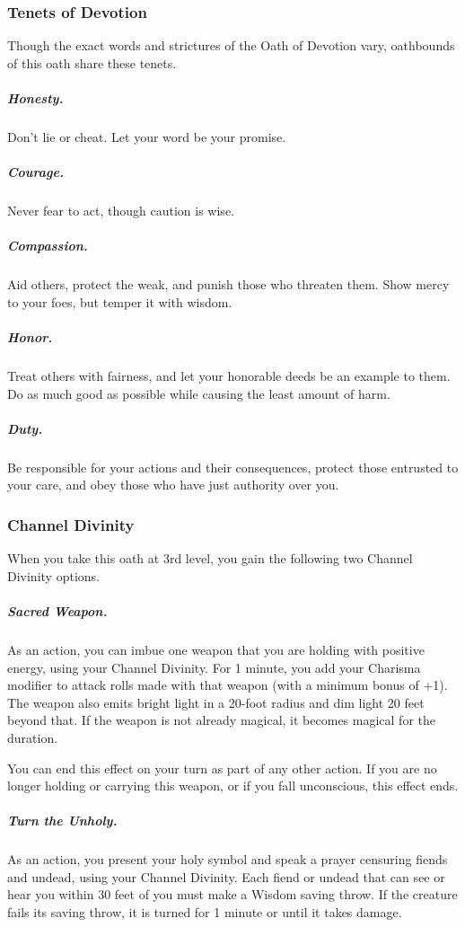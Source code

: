\subsubsection{Tenets of Devotion}

Though the exact words and strictures of the Oath of Devotion vary, oathbounds of this oath share these tenets.

\subparagraph*{Honesty.} Don't lie or cheat. Let your word be your promise.

\subparagraph*{Courage.} Never fear to act, though caution is wise.

\subparagraph*{Compassion.} Aid others, protect the weak, and punish those who threaten them. Show mercy to your foes, but temper it with wisdom.

\subparagraph*{Honor.} Treat others with fairness, and let your honorable deeds be an example to them. Do as much good as possible while causing the least amount of harm.

\subparagraph*{Duty.} Be responsible for your actions and their consequences, protect those entrusted to your care, and obey those who have just authority over you.                  

\subsubsection{Channel Divinity}

When you take this oath at 3rd level, you gain the following two Channel Divinity options.

\subparagraph*{Sacred Weapon.} As an action, you can imbue one weapon that you are holding with positive energy, using your Channel Divinity. For 1 minute, you add your Charisma modifier to attack rolls made with that weapon (with a minimum bonus of +1). The weapon also emits bright light in a 20-foot radius and dim light 20 feet beyond that. If the weapon is not already magical, it becomes magical for the duration.

You can end this effect on your turn as part of any other action. If you are no longer holding or carrying this weapon, or if you fall unconscious, this effect ends.

\subparagraph*{Turn the Unholy.} As an action, you present your holy symbol and speak a prayer censuring fiends and undead, using your Channel Divinity. Each fiend or undead that can see or hear you within 30 feet of you must make a Wisdom saving throw. If the creature fails its saving throw, it is turned for 1 minute or until it takes damage.

